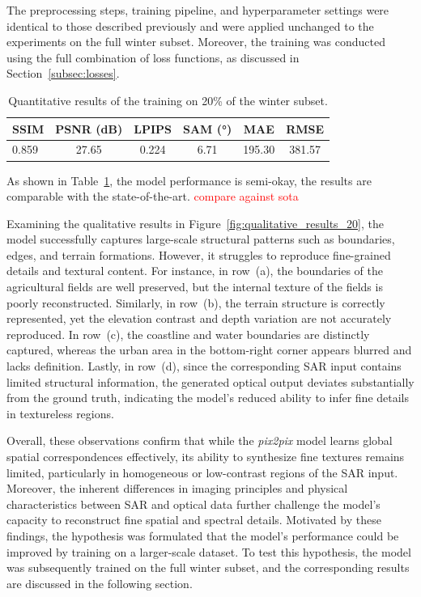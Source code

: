 The preprocessing steps, training pipeline, and hyperparameter settings were identical to those described previously and were applied unchanged to the experiments on the full winter subset. Moreover, the training was conducted using the full combination of loss functions, as discussed in Section~\ref{subsec:losses}.


\begin{table}[h!]
\centering
\caption[Quantitative results of 20\% training winter subset]{Quantitative results of the training on 20\% of the winter subset.}
\begin{tabular}{lccccc}
\toprule
\textbf{SSIM} & \textbf{PSNR (dB)} & \textbf{LPIPS} & \textbf{SAM (°)} & \textbf{MAE} & \textbf{RMSE} \\
\midrule
0.859 & 27.65 & 0.224 & 6.71 & 195.30 & 381.57 \\
\bottomrule
\end{tabular}
\label{tab:quantitative_result_20}
\end{table}

As shown in Table~\ref{tab:quantitative_result_20}, the model performance is semi-okay, the results are comparable with the state-of-the-art. 
\textcolor{red}{compare against sota}

Examining the qualitative results in Figure~\ref{fig:qualitative_results_20}, the model successfully captures large-scale structural patterns such as boundaries, edges, and terrain formations. However, it struggles to reproduce fine-grained details and textural content. For instance, in row~(a), the boundaries of the agricultural fields are well preserved, but the internal texture of the fields is poorly reconstructed. Similarly, in row~(b), the terrain structure is correctly represented, yet the elevation contrast and depth variation are not accurately reproduced. In row~(c), the coastline and water boundaries are distinctly captured, whereas the urban area in the bottom-right corner appears blurred and lacks definition. Lastly, in row~(d), since the corresponding SAR input contains limited structural information, the generated optical output deviates substantially from the ground truth, indicating the model’s reduced ability to infer fine details in textureless regions.

Overall, these observations confirm that while the \textit{pix2pix} model learns global spatial correspondences effectively, its ability to synthesize fine textures remains limited, particularly in homogeneous or low-contrast regions of the SAR input. Moreover, the inherent differences in imaging principles and physical characteristics between SAR and optical data further challenge the model’s capacity to reconstruct fine spatial and spectral details. Motivated by these findings, the hypothesis was formulated that the model’s performance could be improved by training on a larger-scale dataset. To test this hypothesis, the model was subsequently trained on the full winter subset, and the corresponding results are discussed in the following section.

